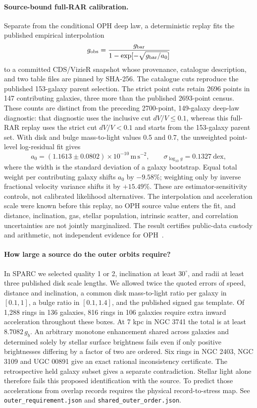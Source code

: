 \documentclass[11pt]{article}
\begin{document}
\paragraph{Source-bound full-RAR calibration.}
Separate from the conditional OPH deep law, a deterministic replay fits the
published empirical interpolation
\[
g_{\rm obs}=\frac{g_{\rm bar}}
 {1-\exp[-\sqrt{g_{\rm bar}/a_0}]}
\]
to a committed CDS/VizieR snapshot whose provenance, catalogue description,
and two table files are pinned by SHA-256. The catalogue cuts reproduce the
published 153-galaxy parent selection. The strict point cuts retain 2696
points in 147 contributing galaxies, three more than the published 2693-point
census. These counts are distinct from the preceding 2700-point, 149-galaxy
deep-law diagnostic: that diagnostic uses the inclusive cut
\(dV/V\le0.1\), whereas this full-RAR replay uses the strict cut
\(dV/V<0.1\) and starts from the 153-galaxy parent set. With disk and bulge
mass-to-light values 0.5 and 0.7, the unweighted
point-level log-residual fit gives
\[
a_0=(1.1613\mathbin{\pm}0.0802)\times10^{-10}\,\mathrm{m\,s^{-2}},
\qquad \sigma_{\log_{10}g}=0.1327\ \mathrm{dex},
\]
where the width is the standard deviation of a galaxy bootstrap. Equal total
weight per contributing galaxy shifts \(a_0\) by \(-9.58\%\); weighting only
by inverse fractional velocity variance shifts it by \(+15.49\%\). These are
estimator-sensitivity controls, not calibrated likelihood alternatives. The
interpolation and acceleration scale were known before this replay, no OPH
source value enters the fit, and distance, inclination, gas, stellar
population, intrinsic scatter, and correlation uncertainties are not jointly
marginalized. The result certifies public-data custody and arithmetic, not
independent evidence for OPH~\cite{mls2016,ophrar}.

\paragraph{How large a source do the outer orbits require?}
In SPARC we selected quality 1 or 2, inclination at least \(30^\circ\),
and radii at least three published disk scale lengths. We allowed
twice the quoted errors of speed, distance and inclination, a common
disk mass-to-light ratio per galaxy in \([0.1,1]\), a bulge ratio in
\([0.1,1.4]\), and the published signed gas template. Of 1,288 rings
in 136 galaxies, 816 rings in 106 galaxies require extra inward
acceleration throughout these boxes. At 7 kpc in NGC 3741 the total
is at least \(8.7082\,g_b\). An arbitrary monotone enhancement shared
across galaxies and determined solely by stellar surface brightness
fails even if only positive brightnesses differing by a factor of two
are ordered. Six rings in NGC 2403, NGC 3109 and UGC 00891 give an
exact rational inconsistency certificate. The retrospective held
galaxy subset gives a separate contradiction. Stellar light alone
therefore fails this proposed identification with the source. To
predict those accelerations from overlap records requires the physical
record-to-stress map. See \texttt{outer\_requirement.json} and
\texttt{shared\_outer\_order.json}.
\end{document}
